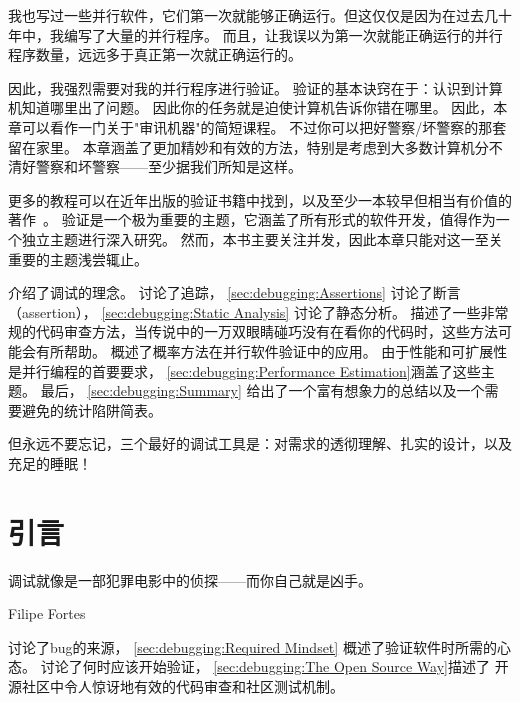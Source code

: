 
%

我也写过一些并行软件，它们第一次就能够正确运行。但这仅仅是因为在过去几十年中，我编写了大量的并行程序。
而且，让我误以为第一次就能正确运行的并行程序数量，远远多于真正第一次就正确运行的。

因此，我强烈需要对我的并行程序进行验证。
验证的基本诀窍在于：认识到计算机知道哪里出了问题。
因此你的任务就是迫使计算机告诉你错在哪里。
因此，本章可以看作一门关于"审讯机器"的简短课程。
不过你可以把好警察/坏警察的那套留在家里。
本章涵盖了更加精妙和有效的方法，特别是考虑到大多数计算机分不清好警察和坏警察——至少据我们所知是这样。

更多的教程可以在近年出版的验证书籍中找到，以及至少一本较早但相当有价值的著作~\cite{GlenfordJMyers1979}。
验证是一个极为重要的主题，它涵盖了所有形式的软件开发，值得作为一个独立主题进行深入研究。
然而，本书主要关注并发，因此本章只能对这一至关重要的主题浅尝辄止。

介绍了调试的理念。
讨论了追踪，
\cref{sec:debugging:Assertions}
讨论了断言（assertion），
\cref{sec:debugging:Static Analysis}
讨论了静态分析。
描述了一些非常规的代码审查方法，当传说中的一万双眼睛碰巧没有在看你的代码时，这些方法可能会有所帮助。
概述了概率方法在并行软件验证中的应用。
由于性能和可扩展性是并行编程的首要要求，
\cref{sec:debugging:Performance Estimation}涵盖了这些主题。
最后，
\cref{sec:debugging:Summary}
给出了一个富有想象力的总结以及一个需要避免的统计陷阱简表。

但永远不要忘记，三个最好的调试工具是：对需求的透彻理解、扎实的设计，以及充足的睡眠！

\section{引言}
\label{sec:debugging:Introduction}
%
\epigraph{调试就像是一部犯罪电影中的侦探——而你自己就是凶手。}
	 {Filipe Fortes}

讨论了bug的来源，
\cref{sec:debugging:Required Mindset}
概述了验证软件时所需的心态。
讨论了何时应该开始验证，
\cref{sec:debugging:The Open Source Way}描述了
开源社区中令人惊讶地有效的代码审查和社区测试机制。

